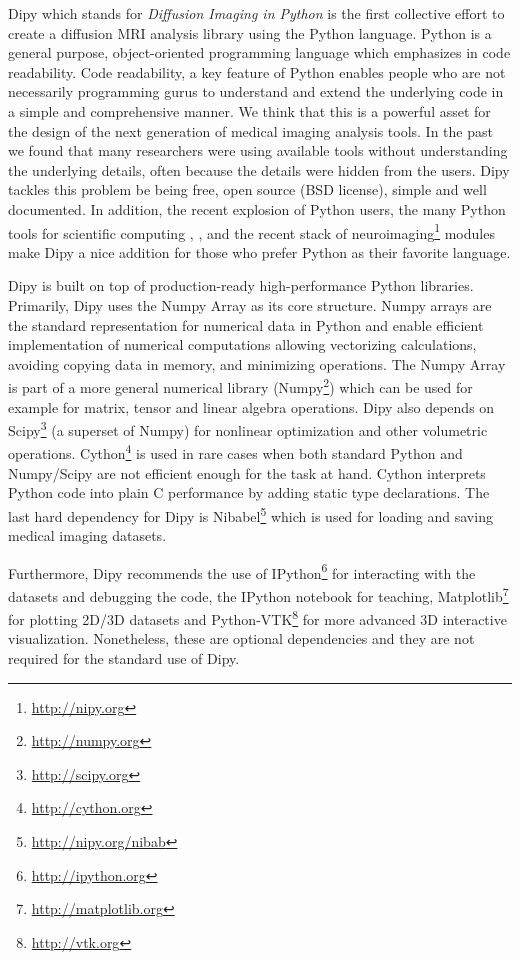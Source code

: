 \documentclass{bioinfo}
\begin{document}
Dipy which stands for \textit{Diffusion Imaging in Python} is the first collective effort to create a diffusion MRI analysis library using the Python language. Python is a general purpose, object-oriented programming language which emphasizes in code readability. Code readability, a key feature of Python enables people who are not necessarily programming gurus to understand and extend the underlying code in a simple and comprehensive manner. We think that this is a powerful asset for the design of the next generation of medical imaging analysis tools. In the past we found that many researchers were using available tools without understanding the underlying details, often because the details were hidden from the users. Dipy tackles this problem be being free, open source (BSD license), simple and well documented. In addition, the recent explosion of Python users, the many Python tools for scientific computing \citep{perez_python:11}, \citep{mckinney_python:12}, \citep{perez_ipython:07} and the recent stack of neuroimaging\footnote{\url{http://nipy.org}} modules make Dipy a nice addition for those who prefer Python as their favorite language.

Dipy is built on top of production-ready high-performance Python libraries. Primarily, Dipy uses the Numpy Array \citep{van_numpy:11} as its core structure. Numpy arrays are the standard representation for numerical data in Python and enable efficient implementation of numerical computations allowing vectorizing calculations, avoiding copying data in memory, and minimizing operations. The Numpy Array is part of a more general numerical library (Numpy\footnote{\url{http://numpy.org}}) which can be used for example for matrix, tensor and linear algebra operations. Dipy also depends on Scipy\footnote{\url{http://scipy.org}} (a superset of Numpy) for nonlinear optimization and other volumetric operations. Cython\footnote{\url{http://cython.org}} is used in rare cases when both standard Python and Numpy/Scipy are not efficient enough for the task at hand. Cython interprets Python code into plain C performance by adding static type declarations. The last hard dependency for Dipy is Nibabel\footnote{\url{http://nipy.org/nibab}} which is used for loading and saving medical imaging datasets.

Furthermore, Dipy recommends the use of IPython\footnote{\url{http://ipython.org}} for interacting with the datasets and debugging the code, the IPython notebook for teaching, Matplotlib\footnote{\url{http://matplotlib.org}} for plotting 2D/3D datasets and Python-VTK\footnote{\url{http://vtk.org}} for more advanced 3D interactive visualization. Nonetheless, these are optional dependencies and they are not required for the standard use of Dipy.
\end{document}
